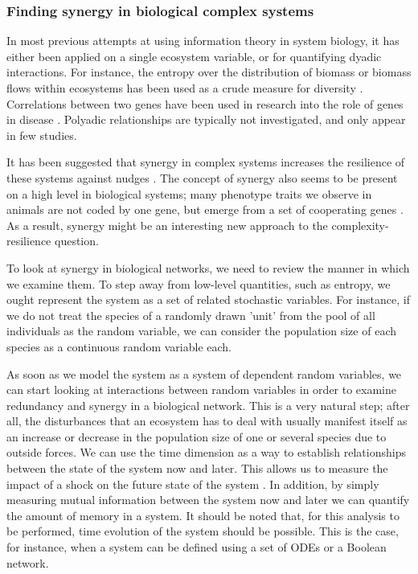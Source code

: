 \documentclass[../main.tex]{subfiles}
\begin{document}
\subsubsection{Finding synergy in biological complex systems}

In most previous attempts at using information theory in system biology, it has either been applied on a single ecosystem variable, or for quantifying dyadic interactions.
For instance, the entropy over the distribution of biomass or biomass flows within ecosystems has been used as a crude measure for diversity \cite{ulanowicz2009quantifying}.
Correlations between two genes have been used in research into the role of genes in disease \cite{lu2004gene}.
Polyadic relationships are typically not investigated, and only appear in few studies.

It has been suggested that synergy in complex systems increases the resilience of these systems against nudges \cite{quax2017quantifying}.
The concept of synergy also seems to be present on a high level in biological systems; many phenotype traits we observe in animals are not coded by one gene, but emerge from a set of cooperating genes \cite{griffith2014quantifying}.
As a result, synergy might be an interesting new approach to the complexity-resilience question.

To look at synergy in biological networks, we need to review the manner in which we examine them.
To step away from low-level quantities, such as entropy, we ought represent the system as a set of related stochastic variables.
For instance, if we do not treat the species of a randomly drawn 'unit' from the pool of all individuals as the random variable, we can consider the population size of each species as a continuous random variable each.

As soon as we model the system as a system of dependent random variables, we can start looking at interactions between random variables in order to examine redundancy and synergy in a biological network.
This is a very natural step; after all, the disturbances that an ecosystem has to deal with usually manifest itself as an increase or decrease in the population size of one or several species due to outside forces.
We can use the time dimension as a way to establish relationships between the state of the system now and later.
This allows us to measure the impact of a shock on the future state of the system \cite{QuaxPersonal}.
In addition, by simply measuring mutual information between the system now and later we can quantify the amount of memory in a system.
It should be noted that, for this analysis to be performed, time evolution of the system should be possible.
This is the case, for instance, when a system can be defined using a set of ODEs or a Boolean network.
\end{document}
